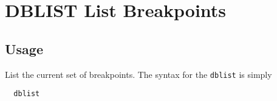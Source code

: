 \section{DBLIST List Breakpoints}

\subsection{Usage}

List the current set of breakpoints.  The syntax for the
\verb|dblist| is simply
\begin{verbatim}
  dblist
\end{verbatim}
